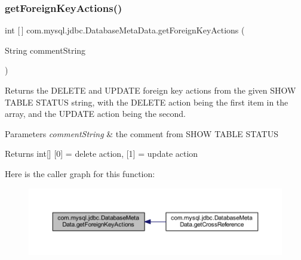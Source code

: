 \subsubsection{\texorpdfstring{get\+Foreign\+Key\+Actions()}{getForeignKeyActions()}}
{\footnotesize\ttfamily int \mbox{[}$\,$\mbox{]} com.\+mysql.\+jdbc.\+Database\+Meta\+Data.\+get\+Foreign\+Key\+Actions (\begin{DoxyParamCaption}\item[{String}]{comment\+String }\end{DoxyParamCaption})\hspace{0.3cm}{\ttfamily [protected]}}

Returns the D\+E\+L\+E\+TE and U\+P\+D\+A\+TE foreign key actions from the given \textquotesingle{}S\+H\+OW T\+A\+B\+LE S\+T\+A\+T\+US\textquotesingle{} string, with the D\+E\+L\+E\+TE action being the first item in the array, and the U\+P\+D\+A\+TE action being the second.


\begin{DoxyParams}{Parameters}
{\em comment\+String} & the comment from \textquotesingle{}S\+H\+OW T\+A\+B\+LE S\+T\+A\+T\+US\textquotesingle{} \\
\hline
\end{DoxyParams}
\begin{DoxyReturn}{Returns}
int\mbox{[}\mbox{]} \mbox{[}0\mbox{]} = delete action, \mbox{[}1\mbox{]} = update action 
\end{DoxyReturn}
Here is the caller graph for this function\+:\nopagebreak
\begin{figure}[H]
\begin{center}
\leavevmode
\includegraphics[width=350pt]{classcom_1_1mysql_1_1jdbc_1_1_database_meta_data_a83e22a1075216419f1fcd4d37b8b0fee_icgraph}
\end{center}
\end{figure}
\mbox{\label{classcom_1_1mysql_1_1jdbc_1_1_database_meta_data_aa24b9831163c2cfb148ff010252a76a3}} 
